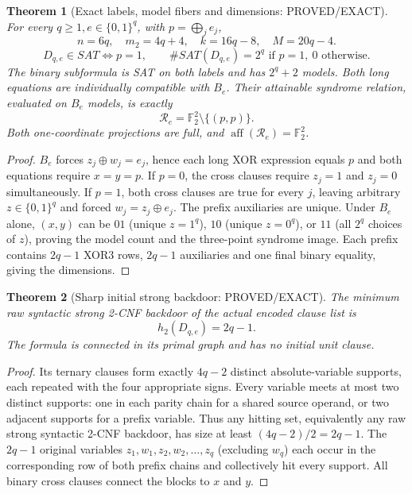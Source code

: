 \documentclass[11pt]{article}
\newtheorem{theorem}{Theorem}
\begin{document}
\begin{theorem}[Exact labels, model fibers and dimensions: PROVED/EXACT]
For every $q\ge1,e\in\{0,1\}^q$, with $p=\bigoplus_j e_j$,
\[
\boxed{n=6q,\quad m_2=4q+4,\quad k=16q-8,\quad M=20q-4.}
\]
\[
\boxed{D_{q,e}\in SAT\iff p=1,\qquad
\#SAT(D_{q,e})=2^q\text{ if }p=1,\ 0\text{ otherwise}.}
\]
The binary subformula is SAT on both labels and has $2^q+2$ models. Both long equations are individually compatible with $B_e$. Their attainable syndrome relation, evaluated on $B_e$ models, is exactly
\[
\mathcal R_e=\mathbb F_2^2\setminus\{(p,p)\}.
\]
Both one-coordinate projections are full, and $\operatorname{aff}(\mathcal R_e)=\mathbb F_2^2$.
\end{theorem}
\begin{proof}
$B_e$ forces $z_j\oplus w_j=e_j$, hence each long XOR expression equals $p$ and both equations require $x=y=p$. If $p=0$, the cross clauses require $z_j=1$ and $z_j=0$ simultaneously. If $p=1$, both cross clauses are true for every $j$, leaving arbitrary $z\in\{0,1\}^q$ and forced $w_j=z_j\oplus e_j$. The prefix auxiliaries are unique. Under $B_e$ alone, $(x,y)$ can be $01$ (unique $z=1^q$), $10$ (unique $z=0^q$), or $11$ (all $2^q$ choices of $z$), proving the model count and the three-point syndrome image. Each prefix contains $2q-1$ XOR3 rows, $2q-1$ auxiliaries and one final binary equality, giving the dimensions.
\end{proof}

\begin{theorem}[Sharp initial strong backdoor: PROVED/EXACT]
The minimum \emph{raw syntactic} strong 2-CNF backdoor of the actual encoded clause list is
\[
\boxed{h_2(D_{q,e})=2q-1}.
\]
The formula is connected in its primal graph and has no initial unit clause.
\end{theorem}
\begin{proof}
Its ternary clauses form exactly $4q-2$ distinct absolute-variable supports, each repeated with the four appropriate signs. Every variable meets at most two distinct supports: one in each parity chain for a shared source operand, or two adjacent supports for a prefix variable. Thus any hitting set, equivalently any raw strong syntactic 2-CNF backdoor, has size at least $(4q-2)/2=2q-1$. The $2q-1$ original variables $z_1,w_1,z_2,w_2,\ldots,z_q$ (excluding $w_q$) each occur in the corresponding row of both prefix chains and collectively hit every support. All binary cross clauses connect the blocks to $x$ and $y$.
\end{proof}
\end{document}
